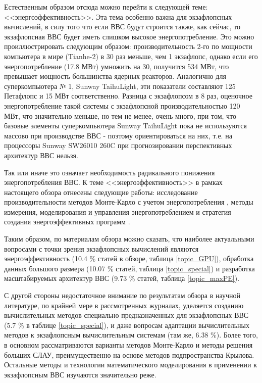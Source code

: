 Естественным образом отсюда можно перейти к следующей теме: <<энергоэффективность>>. Эта тема особенно важна для экзафлопсных вычислений, в силу того что если ВВС будут строится также, как сейчас, то экзафлопсная ВВС будет иметь слишком высокое энергопотребление. Это можно проиллюстрировать следующим образом: производительность 2-го по мощности компьютера в мире (Tianhe-2) в 30 раз меньше, чем 1 экзафлопс, однако если его энергопотребление (17.8 МВт) умножить на 30, получится 534 МВт, что превышает мощность большинства ядерных реакторов. 
Аналогично для суперкомпьютера № 1, Sunway TaihuLight, эти показатели составляют 125 Петафлопс и 15 МВт соответственно. Разница с экзафлопсом в 8 раз, оценочное энергопотребление такой системы с экзафлопсной производительностью 120 МВт, что значительно меньше, но тем не менее, очень много, при том, что базовые элементы суперкомпьютера Sunway TaihuLight пока не используются массово при производстве ВВС - поэтому ориентироваться на них, т.е. на процессоры Sunway SW26010 260C при прогнозировании перспективных 
архитектур ВВС нельзя.

Так или иначе это означает необходимость радикального понижения энергопотребления ВВС. К теме <<энергоэффективность>> в рамках настоящего обзора отнесены следующие работы: исследование производительности методов Монте-Карло с учетом энергопотребления \cite{Atanassov20152719}, методы измерения, моделирования и управления энергопотреблением \cite{Goel20127} и стратегия создания энергоэффективных программ \cite{Trefethen2013}. 





Таким образом, по материалам обзора можно сказать, что наиболее актуальными вопросами с точки зрения экзафлопсных вычислений являются энергоэффективность (10.4 \% статей в обзоре, таблица \ref{topic_GPU}),
обработка данных большого размера (10.07 \% статей, таблица \ref{topic_special}) и  разработка масштабируемых архитектур ВВС (9.73 \% статей, таблица \ref{topic_maxPE}).

С другой стороны недостаточное внимание по результатам обзора в научной литературе, по крайней мере в рассмотренных журналах, уделяется созданию вычислительных методов специально предназначенных для экзафлопсных ВВС (5.7 \% в таблице \ref{topic_special}), и даже вопросам адаптации вычислительных методов к экзафлопсным вычислительным системам (там же, 6.38 \%). Более того, в основном рассматриваются варианты методов Монте-Карло и методы решения больших СЛАУ, преимущественно на основе методов подпространства Крылова. Остальные методы и технологии математического моделирования в применении к экзафлопсным ВВС изучаются значительно реже.

